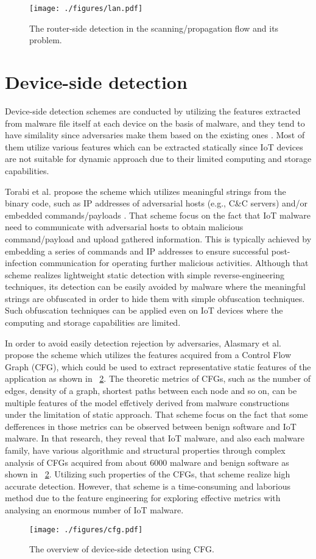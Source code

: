 \begin{figure}[h]
 \centering
 \texttt{[image: ./figures/lan.pdf]}
 \caption{The router-side detection in the scanning/propagation flow and its problem.} 
 \label{fig:lan}
\end{figure}

\section{Device-side detection} 
Device-side detection schemes are conducted by utilizing the features extracted from malware file itself at each device on the basis of malware, and they tend to have similality since adversaries make them based on the existing ones \cite{om, cfg}.
Most of them utilize various features which can be extracted statically since IoT devices are not suitable for dynamic approach due to their limited computing and storage capabilities.

Torabi et al. propose the scheme which utilizes meaningful strings from the binary code, such as IP addresses of adversarial hosts (e.g., C\&C servers) and/or embedded commands/payloads \cite{om}.
That scheme focus on the fact that IoT malware need to communicate with adversarial hosts to obtain malicious command/payload and upload gathered information.
This is typically achieved by embedding a series of commands and IP addresses to ensure successful post-infection communication for operating further malicious activities. 
Although that scheme realizes lightweight static detection with simple reverse-engineering techniques, its detection can be easily avoided by malware where the meaningful strings are obfuscated in order to hide them with simple obfuscation techniques.
Such obfuscation techniques can be applied even on IoT devices where the computing and storage capabilities are limited.

In order to avoid easily detection rejection by adversaries, Alasmary et al. \cite{cfg} propose the scheme which utilizes the features acquired from a Control Flow Graph (CFG), which could be used to extract representative static features of the application as shown in \figurename~\ref{fig:cfg}.
The theoretic metrics of CFGs, such as the number of edges, density of a graph, shortest paths between each node and so on, can be multiple features of the model effctively derived from malware constructions under the limitation of static approach.
That scheme focus on the fact that some defferences in those metrics can be observed between benign software and IoT malware.
In that research, they reveal that IoT malware, and also each malware family, have various algorithmic and structural properties through complex analysis of CFGs acquired from about 6000 malware and benign software as shown in \figurename~\ref{fig:cfg}. 
Utilizing such properties of the CFGs, that scheme realize high accurate detection.
However, that scheme is a time-consuming and laborious method due to the feature engineering for exploring effective metrics with analysing an enormous number of IoT malware.

\begin{figure}[h]
 \centering
 \texttt{[image: ./figures/cfg.pdf]}
 \caption{The overview of device-side detection using CFG.} 
 \label{fig:cfg}
\end{figure}
\afterpage{\clearpage}
\newpage
\newpage

